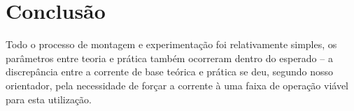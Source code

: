 \chapter{Conclus\~{a}o}
Todo o processo de montagem e experimentação foi relativamente simples, os parâmetros entre teoria e prática também ocorreram dentro do esperado – a discrepância entre a corrente de base teórica e prática se deu, segundo nosso orientador, pela necessidade de forçar a corrente à uma faixa de operação viável para esta utilização.